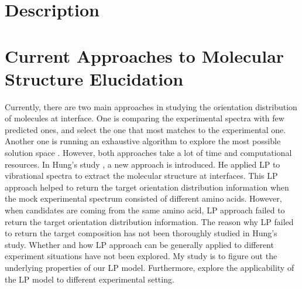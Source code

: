  \label{ch:2}
\section{Description}

\section{Current Approaches to Molecular Structure Elucidation}
Currently, there are two main approaches in studying the orientation distribution of molecules at interface. One is comparing the experimental spectra with few predicted ones, and select the one that most matches to the experimental one. Another one is running an exhaustive algorithm to explore the most possible solution space \cite{hore0033-rotations}. However, both approaches take a lot of time and computational resources. In Hung's study \cite{KuoKaiHung:Thesis:2015}, a new approach is introduced. He applied LP to vibrational spectra to extract the molecular structure at interfaces. This LP approach helped to return the target orientation distribution information when the mock experimental spectrum consisted of different amino acids. However, when candidates are coming from the same amino acid, LP approach failed to return the target orientation distribution information. The reason why LP failed to return the target composition has not been thoroughly studied in Hung's study. Whether and how LP approach can be generally applied to different experiment situations have not been explored. My study is to figure out the underlying properties of our LP model. Furthermore, explore the applicability of the LP model to different experimental setting. \\
	
